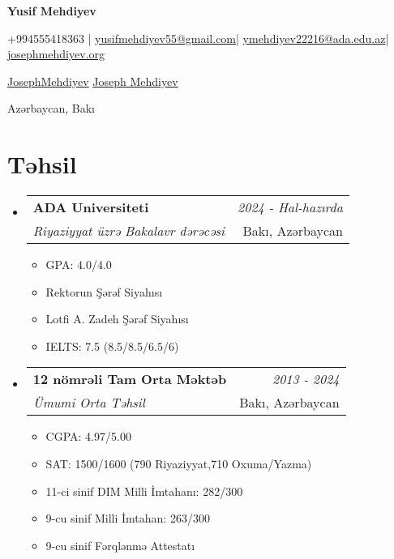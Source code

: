 \documentclass[a4paper,11pt]{article}
\makeatletter
\newcommand{\resumeSubheading}[4]{
    \vspace{0.5mm}
\item
    \begin{tabular*}{0.98\textwidth}[t]{l@{\extracolsep{\fill}}r}
        \textbf{#1} & \textit{\footnotesize{#4}} \\
        \textit{\footnotesize{#3}} &  \footnotesize{#2}\\
    \end{tabular*}
    \vspace{-2.4mm}
}
\newcommand{\resumeSubHeadingListStart}{
\begin{itemize}[leftmargin=*,labelsep=1mm]}
\newcommand{\resumeItemListStart}{
                \begin{itemize}[leftmargin=*,labelsep=1mm,itemsep=0.5mm]}
\newcommand{\resumeSubHeadingListEnd}{
                    \end{itemize}\vspace{2mm}}
\newcommand{\resumeItemListEnd}{
    \end{itemize}\vspace{-2mm}}
\newcommand{\socialicon}[1]{\raisebox{-0.05em}{\resizebox{!}{1em}{#1}}}
\newcommand{\headerfontiii}{\fontfamily{ppl}\selectfont} %
\makeatother
\begin{document}
\headerfontiii

\begin{center}
    {\Huge\textbf{Yusif Mehdiyev}}
\end{center}
\vspace{-5mm}

\begin{center}
    \small{
        +994555418363 | \href{mailto:yusifmehdiyev55@gmail.com}{yusifmehdiyev55@gmail.com}|
        \href{mailto:ymehdiyev22216@ada.edu.az}{ymehdiyev22216@ada.edu.az}|
        \href{https://josephmehdiyev.org/}{josephmehdiyev.org}
    }
\end{center}
\vspace{-5mm}

\begin{center}
    \small{
        \socialicon{\faGithub} \href{https://github.com/JosephMehdiyev}{JosephMehdiyev}
        \socialicon{\faLinkedin} \href{https://www.linkedin.com/in/joseph-mehdiyev-6155982ab/} {Joseph Mehdiyev}
    }
\end{center}
\vspace{-5mm}
\begin{center}
    \small{Azərbaycan, Bakı}
\end{center}

\section{\textbf{Təhsil}}
\resumeSubHeadingListStart

\resumeSubheading
{ADA Universiteti}{Bakı, Azərbaycan}
{Riyaziyyat üzrə Bakalavr dərəcəsi}{2024 - Hal-hazırda}
\resumeItemListStart
\item GPA: 4.0/4.0
\item Rektorun Şərəf Siyahısı
\item Lotfi A. Zadeh Şərəf Siyahısı
\item IELTS: 7.5 (8.5/8.5/6.5/6)
\resumeItemListEnd

\resumeSubheading
{12 nömrəli Tam Orta Məktəb}{Bakı, Azərbaycan}
{Ümumi Orta Təhsil}{2013 - 2024}
\resumeItemListStart
\item CGPA: 4.97/5.00
\item SAT: 1500/1600 (790 Riyaziyyat,710 Oxuma/Yazma)
\item 11-ci sinif DIM Milli İmtahanı: 282/300
\item 9-cu sinif Milli İmtahan: 263/300
\item 9-cu sinif Fərqlənmə Attestatı
\resumeItemListEnd
\resumeSubHeadingListEnd
\end{document}
